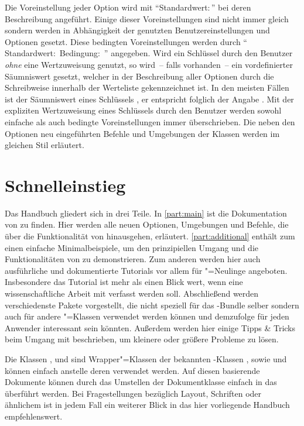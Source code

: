 Die Voreinstellung jeder Option wird mit \enquote{Standardwert:\,} 
bei deren Beschreibung angeführt. Einige dieser Voreinstellungen sind nicht 
immer gleich sondern werden in Abhängigkeit der genutzten Benutzereinstellungen 
und Optionen gesetzt. Diese bedingten Voreinstellungen werden durch 
\enquote{%
  Standardwert:\,%
  \PValue{\,|\,}Bedingung:\,%
}
angegeben. Wird ein Schlüssel durch den Benutzer \emph{ohne} eine Wertzuweisung 
genutzt, so wird~-- falls vorhanden~-- ein vordefinierter Säumniswert gesetzt, 
welcher in der Beschreibung aller Optionen durch die~ 
Schreibweise innerhalb der Werteliste gekennzeichnet ist. In den meisten Fällen 
ist der Säumniswert eines Schlüssels , er entspricht folglich der 
Angabe . Mit der expliziten Wertzuweisung eines 
Schlüssels durch den Benutzer werden sowohl einfache als auch bedingte 
Voreinstellungen immer überschrieben. Die neben den Optionen neu eingeführten 
Befehle und Umgebungen der Klassen werden im gleichen Stil erläutert.



\section{Schnelleinstieg}
Das Handbuch gliedert sich in drei Teile. In \autoref{part:main} ist die 
Dokumentation von \TUDScript zu finden. Hier werden alle neuen Optionen, 
Umgebungen und Befehle, die über die Funktionalität von \KOMAScript{} 
hinausgehen, erläutert. \autoref{part:additional} enthält zum einen einfache 
Minimalbeispiele, um den prinzipiellen Umgang und die Funktionalitäten von 
\TUDScript zu demonstrieren. Zum anderen werden hier auch ausführliche und 
dokumentierte Tutorials vor allem für "=Neulinge angeboten. 
Insbesondere das Tutorial  ist mehr als einen Blick wert, 
wenn eine wissenschaftliche Arbeit mit  verfasst werden soll.
Abschließend werden verschiedenste Pakete vorgestellt, die nicht speziell für 
das \TUDScript-Bundle selber sondern auch für andere "=Klassen
verwendet werden können und demzufolge für jeden Anwender interessant sein 
könnten. Außerdem werden hier einige Tipps \& Tricks beim Umgang mit 
 beschrieben, um kleinere oder größere Probleme zu lösen.

Die Klassen ,  und  
sind Wrapper"=Klassen der bekannten \KOMAScript-Klassen , 
 sowie  und können einfach anstelle deren 
verwendet werden. Auf diesen basierende Dokumente können durch das Umstellen 
der Dokumentklasse einfach in das \TUDCD überführt werden. Bei Fragestellungen 
bezüglich Layout, Schriften oder ähnlichem ist in jedem Fall ein weiterer Blick
in das hier vorliegende Handbuch empfehlenswert.




